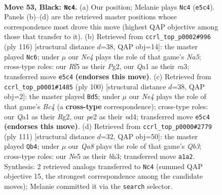 \documentclass[11pt]{article}
\begin{document}
\clearpage

\begin{figure}[p]\centering
\begin{subfigure}{0.46\textwidth}\centering
\resizebox{\linewidth}{!}{%
\newchessgame
\chessboard[
  setfen={8/2k4p/8/p3nr2/3p4/1R6/4P3/qNK5 b - - 1 53},
  showmover=false,
  pgfstyle=straightmove, color=movearrow, markmove={e5-c4}
]}
\caption{}
\end{subfigure}\hfill
\begin{subfigure}{0.46\textwidth}\centering
\resizebox{\linewidth}{!}{%
\newchessgame
\chessboard[
  setfen={8/5k2/p3n3/N7/P6R/r7/6PK/8 w - - 7 59},
  showmover=false,
  pgfstyle=straightmove, color=movearrow, markmove={a5-c6}
]}
\caption{}
\end{subfigure}
\\[4pt]
\begin{subfigure}{0.46\textwidth}\centering
\resizebox{\linewidth}{!}{%
\newchessgame
\chessboard[
  setfen={1r5k/8/8/K3p2p/2BnP3/8/1P3PR1/8 w - - 1 51},
  showmover=false,
  pgfstyle=straightmove, color=movearrow, markmove={c4-d5}
]}
\caption{}
\end{subfigure}\hfill
\begin{subfigure}{0.46\textwidth}\centering
\resizebox{\linewidth}{!}{%
\newchessgame
\chessboard[
  setfen={8/8/1q4pk/p1NR4/8/1P2KP1B/8/8 b - - 4 56},
  showmover=false,
  pgfstyle=straightmove, color=movearrow, markmove={b6-b4}
]}
\caption{}
\end{subfigure}
\caption{\textbf{Move 53, Black: \texttt{Nc4}.} (a) Our position; Melanie plays \texttt{Nc4} (\texttt{e5c4}). Panels (b)--(d) are the retrieved master positions whose correspondence most drove this move (highest QAP objective among those that transfer to it). (b) Retrieved from \texttt{ccrl\_top\_p0002\#996} (ply 116) [structural distance $d$=38, QAP obj=14]: the master played \texttt{Nc6}; under $\mu$ our \emph{Ne4} plays the role of that game's \emph{Na5}; cross-type roles: our \emph{R}f5 as their \emph{P}g2, our \emph{Q}a1 as their \emph{r}a3; transferred move \texttt{e5c4} \textbf{(endorses this move)}. (c) Retrieved from \texttt{ccrl\_top\_p0001\#1485} (ply 100) [structural distance $d$=38, QAP obj=2]: the master played \texttt{Bd5}; under $\mu$ our \emph{Ne4} plays the role of that game's \emph{Bc4} (a \textbf{cross-type} correspondence); cross-type roles: our \emph{Q}a1 as their \emph{R}g2, our \emph{p}e2 as their \emph{n}d4; transferred move \texttt{e5c4} \textbf{(endorses this move)}. (d) Retrieved from \texttt{ccrl\_top\_p0000\#2779} (ply 111) [structural distance $d$=32, QAP obj=50]: the master played \texttt{Qb4}; under $\mu$ our \emph{Qa8} plays the role of that game's \emph{Qb3}; cross-type roles: our \emph{N}e5 as their \emph{b}h3; transferred move \texttt{a1a2}. Synthesis: 2 retrieved analogs transferred to \texttt{Nc4} (summed QAP objective 15, the strongest correspondence among the candidate moves); Melanie committed it via the \texttt{search} selector.}
\label{fig:thought-m105}
\end{figure}
\end{document}
